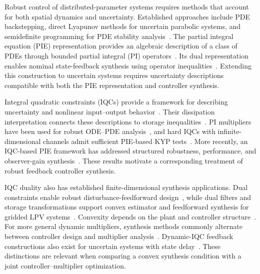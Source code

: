 
Robust control of distributed-parameter systems requires methods that account
for both spatial dynamics and uncertainty. Established approaches include PDE
backstepping, direct Lyapunov methods for uncertain parabolic systems, and
semidefinite programming for PDE stability
analysis~\cite{krstic2008boundary,fridman2012sampled,valmorbida2016pdesdp}.
The partial integral equation (PIE) representation provides an algebraic
description of a class of PDEs through bounded partial integral (PI)
operators~\cite{peet2021pierepresentation,shivakumar2024GDPE}.
Its dual representation enables nominal state-feedback synthesis using
operator inequalities~\cite{shivaknew}. Extending this construction to
uncertain systems requires uncertainty descriptions compatible with both the
PIE representation and controller synthesis.

Integral quadratic constraints (IQCs) provide a framework for describing
uncertainty and nonlinear input--output behavior~\cite{megretski1997system}.
Their dissipation interpretation connects these descriptions to storage
inequalities~\cite{willems1972dissipative1,6915700}.
PI multipliers have been used for robust ODE--PDE
analysis~\cite{9303892}, and hard IQCs with infinite-dimensional channels
admit sufficient PIE-based KYP tests~\cite{10156335}.
More recently, an IQC-based PIE framework has addressed structured robustness,
performance, and observer-gain
synthesis~\cite{lenssen2025muanalysissynthesisframeworkpartial}.
These results motivate a corresponding treatment of robust feedback
controller synthesis.

IQC duality also has established finite-dimensional synthesis applications.
Dual constraints enable robust disturbance-feedforward
design~\cite{kose2009robust}, while dual filters and storage transformations
support convex estimator and feedforward synthesis for gridded LPV
systems~\cite{venkataraman}.
Convexity depends on the plant and controller
structure~\cite{scherer2009robust}.
For more general dynamic multipliers, synthesis methods commonly alternate
between controller design and multiplier
analysis~\cite{veenman2014iqcsynthesis,wang2016robustiqc}.
Dynamic-IQC feedback constructions also exist for uncertain systems with
state delay~\cite{7353149}. These distinctions are relevant when comparing a
convex synthesis condition with a joint controller--multiplier optimization.


